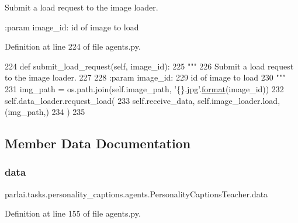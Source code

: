 \begin{DoxyVerb}Submit a load request to the image loader.

:param image_id:
    id of image to load
\end{DoxyVerb}
 

Definition at line 224 of file agents.\+py.


\begin{DoxyCode}
224     \textcolor{keyword}{def }submit\_load\_request(self, image\_id):
225         \textcolor{stringliteral}{"""}
226 \textcolor{stringliteral}{        Submit a load request to the image loader.}
227 \textcolor{stringliteral}{}
228 \textcolor{stringliteral}{        :param image\_id:}
229 \textcolor{stringliteral}{            id of image to load}
230 \textcolor{stringliteral}{        """}
231         img\_path = os.path.join(self.image\_path, \textcolor{stringliteral}{'\{\}.jpg'}.\hyperlink{namespaceparlai_1_1chat__service_1_1services_1_1messenger_1_1shared__utils_a32e2e2022b824fbaf80c747160b52a76}{format}(image\_id))
232         self.data\_loader.request\_load(
233             self.receive\_data, self.image\_loader.load, (img\_path,)
234         )
235 
\end{DoxyCode}


\subsection{Member Data Documentation}
\mbox{\label{classparlai_1_1tasks_1_1personality__captions_1_1agents_1_1PersonalityCaptionsTeacher_ab9c9ef3660e1304eeeaa067f06cf7ab1}} 
\subsubsection{\texorpdfstring{data}{data}}
{\footnotesize\ttfamily parlai.\+tasks.\+personality\+\_\+captions.\+agents.\+Personality\+Captions\+Teacher.\+data}



Definition at line 155 of file agents.\+py.

